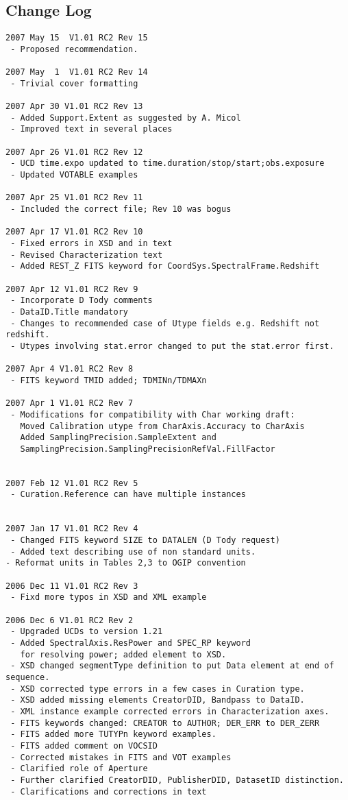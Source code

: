 \documentclass[11pt]{article}
\begin{document}
\subsection{Change Log}

\begin{verbatim}
2007 May 15  V1.01 RC2 Rev 15
 - Proposed recommendation.

2007 May  1  V1.01 RC2 Rev 14
 - Trivial cover formatting

2007 Apr 30 V1.01 RC2 Rev 13
 - Added Support.Extent as suggested by A. Micol
 - Improved text in several places

2007 Apr 26 V1.01 RC2 Rev 12
 - UCD time.expo updated to time.duration/stop/start;obs.exposure
 - Updated VOTABLE examples

2007 Apr 25 V1.01 RC2 Rev 11
 - Included the correct file; Rev 10 was bogus

2007 Apr 17 V1.01 RC2 Rev 10
 - Fixed errors in XSD and in text
 - Revised Characterization text
 - Added REST_Z FITS keyword for CoordSys.SpectralFrame.Redshift

2007 Apr 12 V1.01 RC2 Rev 9
 - Incorporate D Tody comments
 - DataID.Title mandatory
 - Changes to recommended case of Utype fields e.g. Redshift not redshift.
 - Utypes involving stat.error changed to put the stat.error first.

2007 Apr 4 V1.01 RC2 Rev 8
 - FITS keyword TMID added; TDMINn/TDMAXn

2007 Apr 1 V1.01 RC2 Rev 7
 - Modifications for compatibility with Char working draft:
   Moved Calibration utype from CharAxis.Accuracy to CharAxis
   Added SamplingPrecision.SampleExtent and
   SamplingPrecision.SamplingPrecisionRefVal.FillFactor
   
 
2007 Feb 12 V1.01 RC2 Rev 5
 - Curation.Reference can have multiple instances


2007 Jan 17 V1.01 RC2 Rev 4
 - Changed FITS keyword SIZE to DATALEN (D Tody request)
 - Added text describing use of non standard units.
- Reformat units in Tables 2,3 to OGIP convention

2006 Dec 11 V1.01 RC2 Rev 3
 - Fixd more typos in XSD and XML example

2006 Dec 6 V1.01 RC2 Rev 2
 - Upgraded UCDs to version 1.21
 - Added SpectralAxis.ResPower and SPEC_RP keyword
   for resolving power; added element to XSD.
 - XSD changed segmentType definition to put Data element at end of sequence.
 - XSD corrected type errors in a few cases in Curation type.
 - XSD added missing elements CreatorDID, Bandpass to DataID.
 - XML instance example corrected errors in Characterization axes. 
 - FITS keywords changed: CREATOR to AUTHOR; DER_ERR to DER_ZERR  
 - FITS added more TUTYPn keyword examples.
 - FITS added comment on VOCSID
 - Corrected mistakes in FITS and VOT examples
 - Clarified role of Aperture
 - Further clarified CreatorDID, PublisherDID, DatasetID distinction.
 - Clarifications and corrections in text


\end{verbatim}
\end{document}
